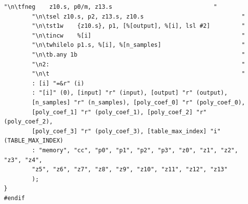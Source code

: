 \documentclass[11pt,a4paper,oneside,english]{extarticle}
\begin{document}
\begin{lstfloat}[h!tb]
\begin{lstlisting}[style=C, captionpos=b, caption={Piecewise polynomial approximation implementations using \arm SVE inline assembly.}, label={code:c:piecewise_polynomial_approximation_use_arm_sve_inline_approx_cubic}]
        "\n\tfneg    z10.s, p0/m, z13.s                             "
        "\n\tsel z10.s, p2, z13.s, z10.s                            "
        "\n\tst1w    {z10.s}, p1, [%[output], %[i], lsl #2]         "
        "\n\tincw    %[i]                                           "
        "\n\twhilelo p1.s, %[i], %[n_samples]                       "
        "\n\tb.any 1b                                               "
        "\n2:                                                       "
        "\n\t                                                       "
        : [i] "=&r" (i) 
        : "[i]" (0), [input] "r" (input), [output] "r" (output),
        [n_samples] "r" (n_samples), [poly_coef_0] "r" (poly_coef_0),
        [poly_coef_1] "r" (poly_coef_1), [poly_coef_2] "r" (poly_coef_2),
        [poly_coef_3] "r" (poly_coef_3), [table_max_index] "i" (TABLE_MAX_INDEX)
        : "memory", "cc", "p0", "p1", "p2", "p3", "z0", "z1", "z2", "z3", "z4",
        "z5", "z6", "z7", "z8", "z9", "z10", "z11", "z12", "z13"
        );
}
#endif
\end{lstlisting}
\end{lstfloat}
\end{document}
